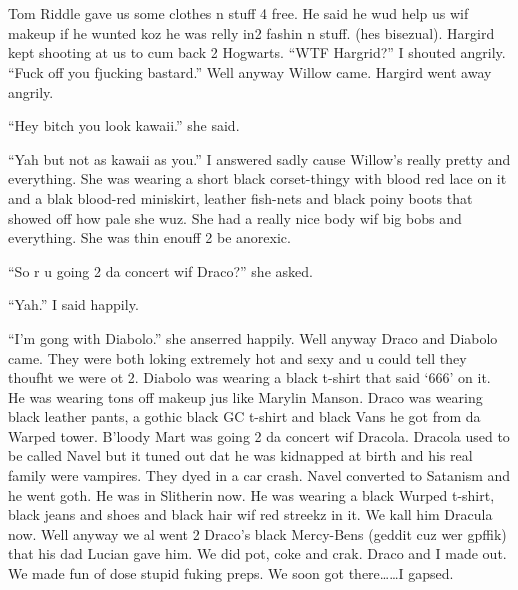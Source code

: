 \section{}



Tom Riddle gave us some clothes n stuff 4 free. He said he wud help us wif makeup if he wunted koz he was relly in2 fashin n stuff. (hes bisezual). Hargird kept shooting at us to cum back 2 Hogwarts. \enquote{WTF Hargrid?} I shouted angrily. \enquote{Fuck off you fjucking bastard.} Well anyway Willow came. Hargird went away angrily.

\enquote{Hey bitch you look kawaii.} she said.

\enquote{Yah but not as kawaii as you.} I answered sadly cause Willow's really pretty and everything. She was wearing a short black corset-thingy with blood red lace on it and a blak blood-red miniskirt, leather fish-nets and black poiny boots that showed off how pale she wuz. She had a really nice body wif big bobs and everything. She was thin enouff 2 be anorexic.

\enquote{So r u going 2 da concert wif Draco?} she asked.

\enquote{Yah.} I said happily.

\enquote{I'm gong with Diabolo.} she anserred happily. Well anyway Draco and Diabolo came. They were both loking extremely hot and sexy and u could tell they thoufht we were ot 2. Diabolo was wearing a black t-shirt that said \enquote*{666} on it. He was wearing tons off makeup jus like Marylin Manson. Draco was wearing black leather pants, a gothic black GC t-shirt and black Vans he got from da Warped tower. B'loody Mart was going 2 da concert wif Dracola. Dracola used to be called Navel but it tuned out dat he was kidnapped at birth and his real family were vampires. They dyed in a car crash. Navel converted to Satanism and he went goth. He was in Slitherin now. He was wearing a black Wurped t-shirt, black jeans and shoes and black hair wif red streekz in it. We kall him Dracula now. Well anyway we al went 2 Draco's black Mercy-Bens (geddit cuz wer gpffik) that his dad Lucian gave him. We did pot, coke and crak. Draco and I made out. We made fun of dose stupid fuking preps. We soon got there\ldots\ldots I gapsed.

